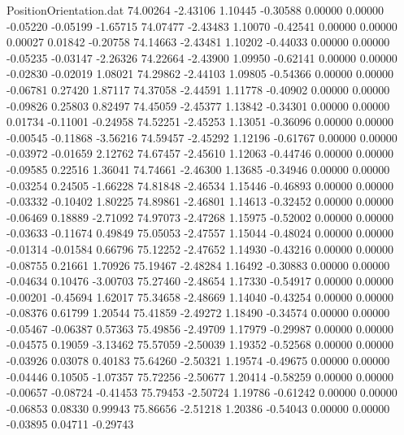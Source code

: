 \begin{filecontents}{PositionOrientation.dat}
  74.00264   -2.43106    1.10445    -0.30588    0.00000    0.00000   -0.05220   -0.05199   -1.65715
  74.07477   -2.43483    1.10070    -0.42541    0.00000    0.00000    0.00027    0.01842   -0.20758
  74.14663   -2.43481    1.10202    -0.44033    0.00000    0.00000   -0.05235   -0.03147   -2.26326
  74.22664   -2.43900    1.09950    -0.62141    0.00000    0.00000   -0.02830   -0.02019    1.08021
  74.29862   -2.44103    1.09805    -0.54366    0.00000    0.00000   -0.06781    0.27420    1.87117
  74.37058   -2.44591    1.11778    -0.40902    0.00000    0.00000   -0.09826    0.25803    0.82497
  74.45059   -2.45377    1.13842    -0.34301    0.00000    0.00000    0.01734   -0.11001   -0.24958
  74.52251   -2.45253    1.13051    -0.36096    0.00000    0.00000   -0.00545   -0.11868   -3.56216
  74.59457   -2.45292    1.12196    -0.61767    0.00000    0.00000   -0.03972   -0.01659    2.12762
  74.67457   -2.45610    1.12063    -0.44746    0.00000    0.00000   -0.09585    0.22516    1.36041
  74.74661   -2.46300    1.13685    -0.34946    0.00000    0.00000   -0.03254    0.24505   -1.66228
  74.81848   -2.46534    1.15446    -0.46893    0.00000    0.00000   -0.03332   -0.10402    1.80225
  74.89861   -2.46801    1.14613    -0.32452    0.00000    0.00000   -0.06469    0.18889   -2.71092
  74.97073   -2.47268    1.15975    -0.52002    0.00000    0.00000   -0.03633   -0.11674    0.49849
  75.05053   -2.47557    1.15044    -0.48024    0.00000    0.00000   -0.01314   -0.01584    0.66796
  75.12252   -2.47652    1.14930    -0.43216    0.00000    0.00000   -0.08755    0.21661    1.70926
  75.19467   -2.48284    1.16492    -0.30883    0.00000    0.00000   -0.04634    0.10476   -3.00703
  75.27460   -2.48654    1.17330    -0.54917    0.00000    0.00000   -0.00201   -0.45694    1.62017
  75.34658   -2.48669    1.14040    -0.43254    0.00000    0.00000   -0.08376    0.61799    1.20544
  75.41859   -2.49272    1.18490    -0.34574    0.00000    0.00000   -0.05467   -0.06387    0.57363
  75.49856   -2.49709    1.17979    -0.29987    0.00000    0.00000   -0.04575    0.19059   -3.13462
  75.57059   -2.50039    1.19352    -0.52568    0.00000    0.00000   -0.03926    0.03078    0.40183
  75.64260   -2.50321    1.19574    -0.49675    0.00000    0.00000   -0.04446    0.10505   -1.07357
  75.72256   -2.50677    1.20414    -0.58259    0.00000    0.00000   -0.00657   -0.08724   -0.41453
  75.79453   -2.50724    1.19786    -0.61242    0.00000    0.00000   -0.06853    0.08330    0.99943
  75.86656   -2.51218    1.20386    -0.54043    0.00000    0.00000   -0.03895    0.04711   -0.29743

\end{filecontents}
